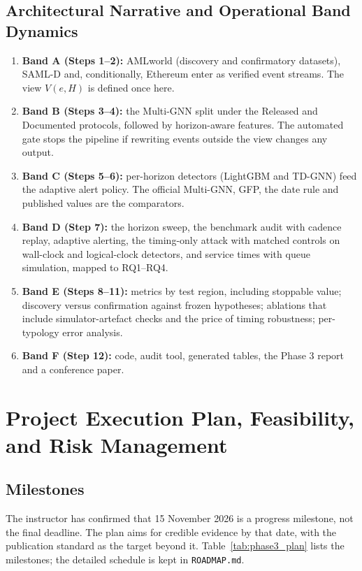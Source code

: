 \documentclass[11pt,a4paper]{article}
\begin{document}
\subsection{Architectural Narrative and Operational Band Dynamics}
\begin{enumerate}[leftmargin=*]
    \item \textbf{Band A (Steps 1--2):} AMLworld (discovery and confirmatory datasets), SAML-D and, conditionally, Ethereum enter as verified event streams. The view $V(e,H)$ is defined once here.
    \item \textbf{Band B (Steps 3--4):} the Multi-GNN split under the Released and Documented protocols, followed by horizon-aware features. The automated gate stops the pipeline if rewriting events outside the view changes any output.
    \item \textbf{Band C (Steps 5--6):} per-horizon detectors (LightGBM and TD-GNN) feed the adaptive alert policy. The official Multi-GNN, GFP, the date rule and published values are the comparators.
    \item \textbf{Band D (Step 7):} the horizon sweep, the benchmark audit with cadence replay, adaptive alerting, the timing-only attack with matched controls on wall-clock and logical-clock detectors, and service times with queue simulation, mapped to RQ1--RQ4.
    \item \textbf{Band E (Steps 8--11):} metrics by test region, including stoppable value; discovery versus confirmation against frozen hypotheses; ablations that include simulator-artefact checks and the price of timing robustness; per-typology error analysis.
    \item \textbf{Band F (Step 12):} code, audit tool, generated tables, the Phase 3 report and a conference paper.
\end{enumerate}

\section{Project Execution Plan, Feasibility, and Risk Management}
\label{sec:execution_plan}

\subsection{Milestones}
The instructor has confirmed that 15 November 2026 is a progress milestone, not the final deadline. The plan aims for credible evidence by that date, with the publication standard as the target beyond it. Table~\ref{tab:phase3_plan} lists the milestones; the detailed schedule is kept in \texttt{ROADMAP.md}.
\end{document}
